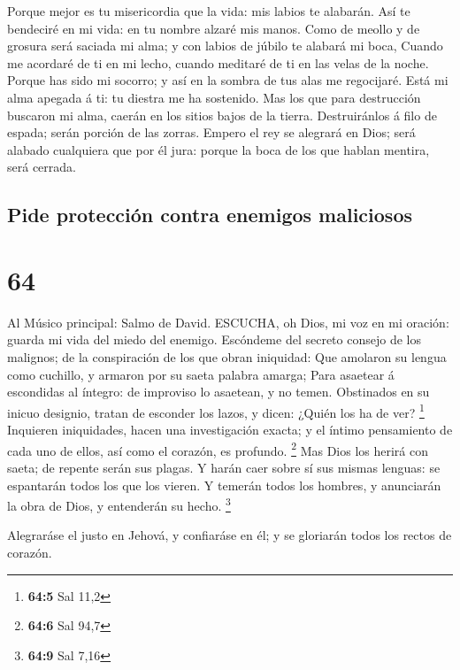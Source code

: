  Porque mejor es tu misericordia que la vida: mis labios te
alabarán.  Así te bendeciré en mi vida: en tu nombre alzaré
mis manos.  Como de meollo y de grosura será saciada mi
alma; y con labios de júbilo te alabará mi boca,  Cuando me
acordaré de ti en mi lecho, cuando meditaré de ti en las velas de la
noche.  Porque has sido mi socorro; y así en la sombra de
tus alas me regocijaré.  Está mi alma apegada á ti: tu
diestra me ha sostenido.  Mas los que para destrucción
buscaron mi alma, caerán en los sitios bajos de la tierra. 
Destruiránlos á filo de espada; serán porción de las zorras.
 Empero el rey se alegrará en Dios; será alabado cualquiera
que por él jura: porque la boca de los que hablan mentira, será cerrada.

\hypertarget{pide-protecciuxf3n-contra-enemigos-maliciosos}{%
\subsection{Pide protección contra enemigos
maliciosos}\label{pide-protecciuxf3n-contra-enemigos-maliciosos}}

\hypertarget{section-63}{%
\section{64}\label{section-63}}

 Al Músico principal: Salmo de David. ESCUCHA, oh Dios, mi
voz en mi oración: guarda mi vida del miedo del enemigo. 
Escóndeme del secreto consejo de los malignos; de la conspiración de los
que obran iniquidad:  Que amolaron su lengua como cuchillo,
y armaron por su saeta palabra amarga;  Para asaetear á
escondidas al íntegro: de improviso lo asaetean, y no temen.
 Obstinados en su inicuo designio, tratan de esconder los
lazos, y dicen: ¿Quién los ha de ver? \footnote{\textbf{64:5} Sal 11,2}
 Inquieren iniquidades, hacen una investigación exacta; y el
íntimo pensamiento de cada uno de ellos, así como el corazón, es
profundo. \footnote{\textbf{64:6} Sal 94,7}  Mas Dios los
herirá con saeta; de repente serán sus plagas.  Y harán caer
sobre sí sus mismas lenguas: se espantarán todos los que los vieren.
 Y temerán todos los hombres, y anunciarán la obra de Dios,
y entenderán su hecho. \footnote{\textbf{64:9} Sal 7,16}

 Alegraráse el justo en Jehová, y confiaráse en él; y se
gloriarán todos los rectos de corazón.

